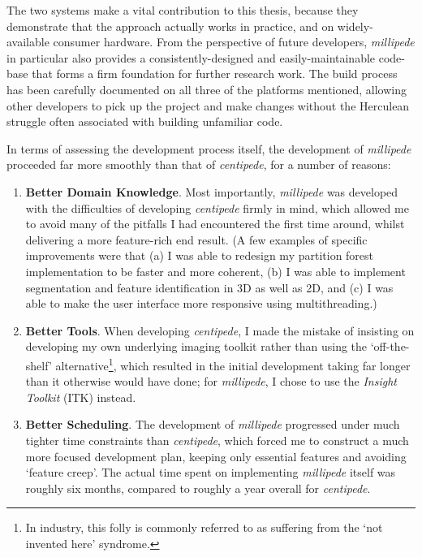 The two systems make a vital contribution to this thesis, because they demonstrate that the approach actually works in practice, and on widely-available consumer hardware. From the perspective of future developers, \emph{millipede} in particular also provides a consistently-designed and easily-maintainable code-base that forms a firm foundation for further research work. The build process has been carefully documented on all three of the platforms mentioned, allowing other developers to pick up the project and make changes without the Herculean struggle often associated with building unfamiliar code.

In terms of assessing the development process itself, the development of \emph{millipede} proceeded far more smoothly than that of \emph{centipede}, for a number of reasons:
%
\begin{enumerate}

\item \textbf{Better Domain Knowledge}. Most importantly, \emph{millipede} was developed with the difficulties of developing \emph{centipede} firmly in mind, which allowed me to avoid many of the pitfalls I had encountered the first time around, whilst delivering a more feature-rich end result. (A few examples of specific improvements were that (a) I was able to redesign my partition forest implementation to be faster and more coherent, (b) I was able to implement segmentation and feature identification in 3D as well as 2D, and (c) I was able to make the user interface more responsive using multithreading.)

\item \textbf{Better Tools}. When developing \emph{centipede}, I made the mistake of insisting on developing my own underlying imaging toolkit rather than using the `off-the-shelf' alternative\footnote{In industry, this folly is commonly referred to as suffering from the `not invented here' syndrome.}, which resulted in the initial development taking far longer than it otherwise would have done; for \emph{millipede}, I chose to use the \emph{Insight Toolkit} (ITK) instead.

\item \textbf{Better Scheduling}. The development of \emph{millipede} progressed under much tighter time constraints than \emph{centipede}, which forced me to construct a much more focused development plan, keeping only essential features and avoiding `feature creep'. The actual time spent on implementing \emph{millipede} itself was roughly six months, compared to roughly a year overall for \emph{centipede}.

\end{enumerate}

